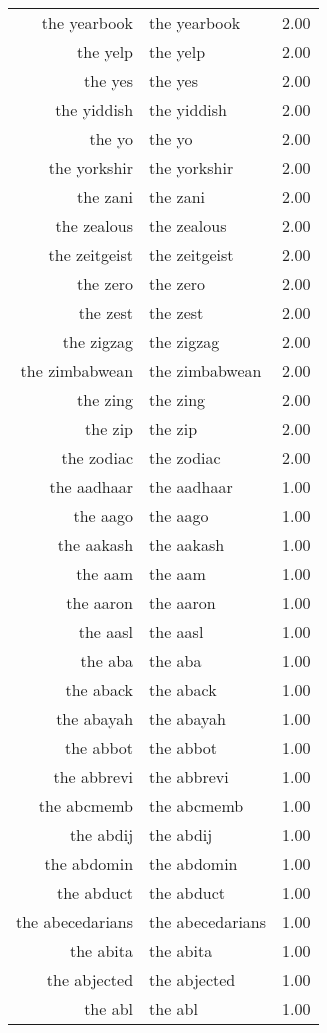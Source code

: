 \begin{table}[ht]
\begin{tabular}{rlr}
  the yearbook & the yearbook & 2.00 \\ 
  the yelp & the yelp & 2.00 \\ 
  the yes & the yes & 2.00 \\ 
  the yiddish & the yiddish & 2.00 \\ 
  the yo & the yo & 2.00 \\ 
  the yorkshir & the yorkshir & 2.00 \\ 
  the zani & the zani & 2.00 \\ 
  the zealous & the zealous & 2.00 \\ 
  the zeitgeist & the zeitgeist & 2.00 \\ 
  the zero & the zero & 2.00 \\ 
  the zest & the zest & 2.00 \\ 
  the zigzag & the zigzag & 2.00 \\ 
  the zimbabwean & the zimbabwean & 2.00 \\ 
  the zing & the zing & 2.00 \\ 
  the zip & the zip & 2.00 \\ 
  the zodiac & the zodiac & 2.00 \\ 
  the aadhaar & the aadhaar & 1.00 \\ 
  the aago & the aago & 1.00 \\ 
  the aakash & the aakash & 1.00 \\ 
  the aam & the aam & 1.00 \\ 
  the aaron & the aaron & 1.00 \\ 
  the aasl & the aasl & 1.00 \\ 
  the aba & the aba & 1.00 \\ 
  the aback & the aback & 1.00 \\ 
  the abayah & the abayah & 1.00 \\ 
  the abbot & the abbot & 1.00 \\ 
  the abbrevi & the abbrevi & 1.00 \\ 
  the abcmemb & the abcmemb & 1.00 \\ 
  the abdij & the abdij & 1.00 \\ 
  the abdomin & the abdomin & 1.00 \\ 
  the abduct & the abduct & 1.00 \\ 
  the abecedarians & the abecedarians & 1.00 \\ 
  the abita & the abita & 1.00 \\ 
  the abjected & the abjected & 1.00 \\ 
  the abl & the abl & 1.00 \\ 

\end{tabular}
\end{table}
